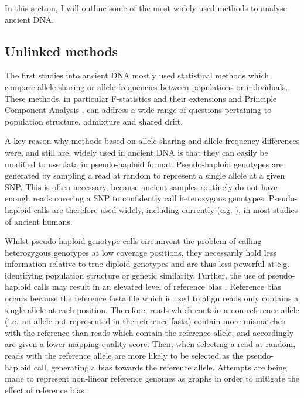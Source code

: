 In this section, I will outline some of the most widely used methods to analyse ancient DNA.

\subsection{Unlinked methods}

The first studies into ancient DNA mostly used statistical methods which compare allele-sharing or allele-frequencies between populations or individuals. These methods, in particular F-statistics and their extensions \cite{Green2010, Patterson2012, peter2016admixture, AssessingqpAdm} and Principle Component Analysis \cite{price2006principal}, can address a wide-range of questions pertaining to population structure, admixture and shared drift. 

A key reason why methods based on allele-sharing and allele-frequency differences were, and still are, widely used in ancient DNA is that they can easily be modified to use data in pseudo-haploid format. Pseudo-haploid genotypes are generated by sampling a read at random to represent a single allele at a given SNP. This is often necessary, because ancient samples routinely do not have enough reads covering a SNP to confidently call heterozygous genotypes. Pseudo-haploid calls are therefore used widely, including currently (e.g. \cite{sirak2021social}), in most studies of ancient humans. 

Whilst pseudo-haploid genotype calls circumvent the problem of calling heterozygous genotypes at low coverage positions, they necessarily hold less information relative to true diploid genotypes and are thus less powerful at e.g. identifying population structure or genetic similarity. Further, the use of pseudo-haploid calls may result in an elevated level of reference bias \cite{GuntherRefBias, Martiniano2017, martiniano2020removing}. Reference bias occurs because the reference fasta file which is used to align reads only contains a single allele at each position. Therefore, reads which contain a non-reference allele (i.e.\ an allele not represented in the reference fasta) contain more mismatches with the reference than reads which contain the reference allele, and accordingly are given a lower mapping quality score. Then, when selecting a read at random, reads with the reference allele are more likely to be selected as the pseudo-haploid call, generating a bias towards the reference allele. Attempts are being made to represent non-linear reference genomes as graphs in order to mitigate the effect of reference bias \cite{Garrison2018, martiniano2020removing}.

